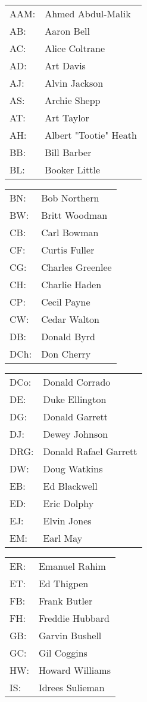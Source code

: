 \documentclass[a4paper, landscape]{article}
\begin{document}
\vfill

{\small
\newcommand{\split}{\end{tabular}\hfill\begin{tabular}{l@{~}l}}
\begin{tabular}{l@{~}l}

AAM:&Ahmed Abdul-Malik\\
AB:&Aaron Bell\\
AC:&Alice Coltrane\\
AD:&Art Davis\\
AJ:&Alvin Jackson\\
AS:&Archie Shepp\\
AT:&Art Taylor\\
AH:&Albert "Tootie" Heath\\
BB:&Bill Barber\\
BL:&Booker Little\\\split
BN:&Bob Northern\\
BW:&Britt Woodman\\
CB:&Carl Bowman\\
CF:&Curtis Fuller\\
CG:&Charles Greenlee\\
CH:&Charlie Haden\\
CP:&Cecil Payne\\
CW:&Cedar Walton\\
DB:&Donald Byrd\\
DCh:&Don Cherry\\\split
DCo:&Donald Corrado\\
DE:&Duke Ellington\\
DG:&Donald Garrett\\
DJ:&Dewey Johnson\\
DRG:&Donald Rafael Garrett\\
DW:&Doug Watkins\\
EB:&Ed Blackwell\\
ED:&Eric Dolphy\\
EJ:&Elvin Jones\\
EM:&Earl May\\\split
ER:&Emanuel Rahim\\
ET:&Ed Thigpen\\
FB:&Frank Butler\\
FH:&Freddie Hubbard\\
GB:&Garvin Bushell\\
GC:&Gil Coggins\\
HW:&Howard Williams\\
IS:&Idrees Sulieman\\

\end{tabular}}
\end{document}
